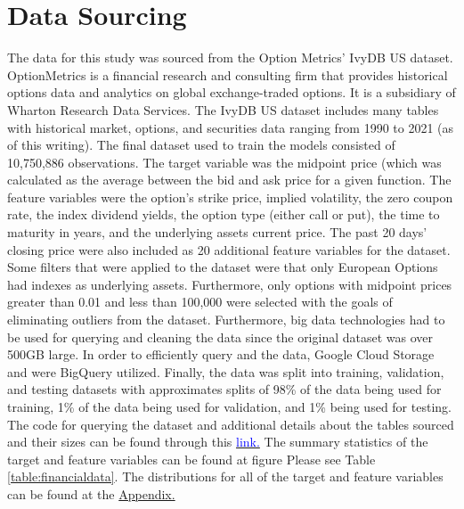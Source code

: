 \documentclass[a4paper]{article}
\begin{document}
\section{Data Sourcing}
The data for this study was sourced from the Option Metrics' IvyDB US dataset. OptionMetrics is a financial research and consulting firm that provides historical options data and analytics on global exchange-traded options. It is a subsidiary of Wharton Research Data Services. The IvyDB US dataset includes many tables with historical market, options, and securities data ranging from 1990 to 2021 (as of this writing). The final dataset used to train the models consisted of 10,750,886 observations. The target variable was the midpoint price (which was calculated as the average between the bid and ask price for a given function. The feature variables were the option's strike price, implied volatility, the zero coupon rate, the index dividend yields, the option type (either call or put), the time to maturity in years, and the underlying assets current price. The past 20 days' closing price were also included as 20 additional feature variables for the dataset. Some filters that were applied to the dataset were that only European Options had indexes as underlying assets. Furthermore, only options with midpoint prices greater than 0.01 and less than 100,000 were selected with the goals of eliminating outliers from the dataset.
Furthermore, big data technologies had to be used for querying and cleaning the data since the original dataset was over 500GB large. In order to efficiently query and the data, Google Cloud Storage and were BigQuery utilized. Finally, the data was split into training, validation, and testing datasets with approximates splits of 98\% of the data being used for training, 1\% of the data being used for validation, and 1\% being used for testing. The code for querying the dataset and additional details about the tables sourced and their sizes can be found through this \href{https://github.com/juan-esteban-berger/Options_Pricing_with_Neural_Networks_and_Gradient_Boosters/blob/main/01_Data_Cleansing.ipynb}{\textcolor{blue}{link.}} The summary statistics of the target and feature variables can be found at figure Please see Table \ref{table:financialdata}. The distributions for all of the target and feature variables can be found at the \hyperref[sec:appendix]{Appendix.}
\end{document}
